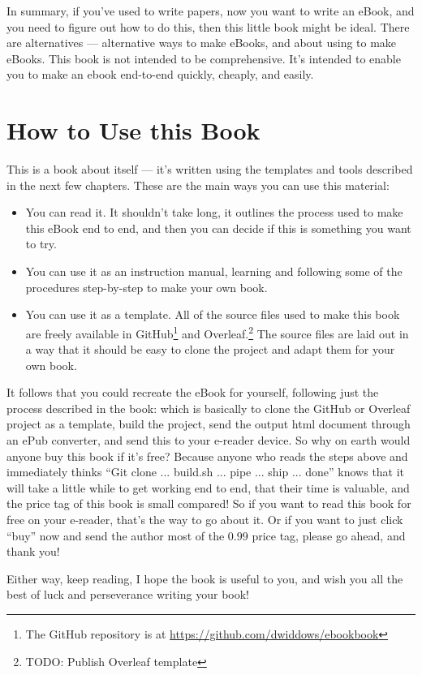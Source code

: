 In summary, if you've used \latex to write papers, now you want to write an eBook,
and you need to figure out how to do this, then this little book might be ideal.
There are alternatives --- alternative ways to make eBooks, and about
using \latex to make eBooks. This book is not intended to be comprehensive. It's
intended to enable you to make an ebook end-to-end quickly, cheaply, and easily.

\section{How to Use this Book}

This is a book about itself --- it's written using the templates and tools described in 
the next few chapters. These are the main ways you can use this material:

\begin{itemize}
    \item You can read it. It shouldn't take long, it outlines the process
    used to make this eBook end to end, and then you can decide if this is something you want to try.
    \item You can use it as an instruction manual, learning and following some of the procedures step-by-step to make your own book.
    \item You can use it as a template. All of the source files used to make this book
    are freely available in GitHub\footnote{The GitHub repository is at \url{https://github.com/dwiddows/ebookbook}} and Overleaf.\footnote{TODO: Publish Overleaf template} The source files are laid out in a way that it
    should be easy to clone the project and adapt them for your own book.
\end{itemize}

It follows that you could recreate the eBook for yourself, following just the process
described in the book: which is basically to clone the GitHub or Overleaf 
project as a template, build
the project, send the output html document through an ePub converter, and send this to
your e-reader device. So why on earth would anyone buy this book if it's free? Because
anyone who reads the steps above and immediately thinks ``Git clone ... build.sh ... 
pipe ... ship ... done'' knows that it will take a little while to get working 
end to end, that their time is valuable, and the price tag of this book is small
compared! So if you want to read this book for free on your e-reader, that's the way
to go about it. Or if you want to just click ``buy'' now and send the author most of the
$0.99$ price tag, please go ahead, and thank you!

Either way, keep reading, I hope the book is useful to you, and wish you 
all the best of luck and perseverance writing your book!
